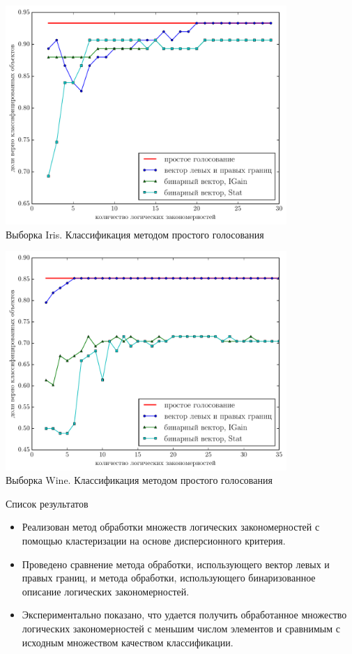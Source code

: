 \documentclass[utf8]{beamer}
\begin{document}
\begin{frame}
  \centering
  \includegraphics[width=0.8\textwidth,keepaspectratio]{iris}
  \\ Выборка Iris. Классификация методом простого голосования
\end{frame}

\begin{frame}
  \centering
  \includegraphics[width=0.8\textwidth,keepaspectratio]{wine}
  \\ Выборка Wine. Классификация методом простого голосования
\end{frame}

\begin{frame}{Список результатов}
  \begin{itemize}
    \item Реализован метод обработки множеств логических
      закономерностей с помощью кластеризации на основе дисперсионного
      критерия.
    \item Проведено сравнение метода обработки, использующего вектор
      левых и правых границ, и метода обработки, использующего
      бинаризованное описание логических закономерностей.
    \item Экспериментально показано, что удается получить обработанное
      множество логических закономерностей с меньшим числом элементов
      и сравнимым с исходным множеством качеством классификации.
  \end{itemize}
\end{frame}
\end{document}
